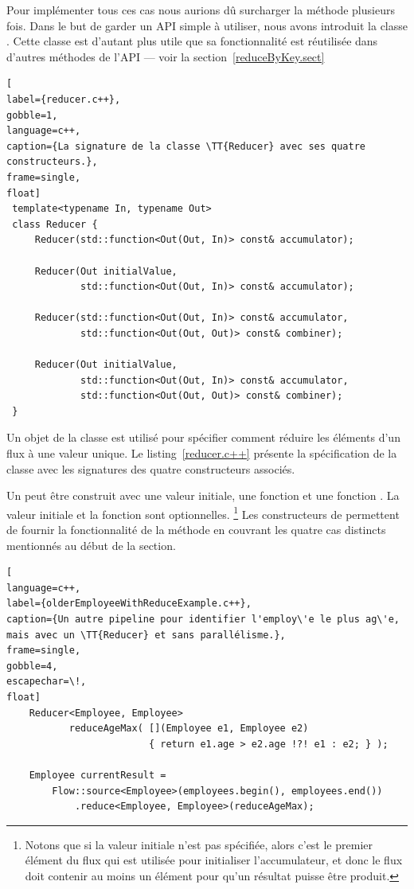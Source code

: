 Pour impl\'ementer tous ces cas nous aurions d\^u surcharger la m\'ethode   plusieurs fois. Dans le but de garder un API simple \`a utiliser, nous avons introduit la classe  . Cette classe est d'autant plus utile que sa fonctionnalit\'e est r\'eutilis\'ee dans d'autres m\'ethodes de l'API --- voir la section~\ref{reduceByKey.sect}


\begin{lstlisting}[
label={reducer.c++},
gobble=1,
language=c++,
caption={La signature de la classe \TT{Reducer} avec ses quatre constructeurs.},
frame=single,
float]
 template<typename In, typename Out>
 class Reducer {
     Reducer(std::function<Out(Out, In)> const& accumulator);

     Reducer(Out initialValue, 
             std::function<Out(Out, In)> const& accumulator);
                	   
     Reducer(std::function<Out(Out, In)> const& accumulator,
             std::function<Out(Out, Out)> const& combiner);
                               	   
     Reducer(Out initialValue, 
             std::function<Out(Out, In)> const& accumulator,
             std::function<Out(Out, Out)> const& combiner);               
 }
\end{lstlisting}


Un objet de la classe  est utilis\'e pour sp\'ecifier comment r\'eduire les \'el\'ements d'un flux \`a une valeur unique. Le listing~\ref{reducer.c++} présente la spécification  de la classe  avec les signatures des quatre constructeurs associ\'es. 

Un  peut être construit avec une valeur initiale, une fonction  et une fonction . La valeur initiale et la fonction  sont optionnelles.%
%
\footnote{Notons que si la valeur initiale n'est pas spécifiée, alors
c'est le premier élément du flux qui est utilisée pour initialiser
l'accumulateur, et donc le flux doit contenir au moins un élément pour
qu'un résultat puisse être produit.}
%
Les constructeurs de  permettent de fournir la fonctionnalit\'e de la m\'ethode  en couvrant les quatre cas distincts mentionn\'es au d\'ebut de la section.
%


\begin{lstlisting}[
language=c++,
label={olderEmployeeWithReduceExample.c++},
caption={Un autre pipeline pour identifier l'employ\'e le plus ag\'e, mais avec un \TT{Reducer} et sans parallélisme.},
frame=single,
gobble=4,
escapechar=\!,
float]
    Reducer<Employee, Employee> 
           reduceAgeMax( [](Employee e1, Employee e2) 
                         { return e1.age > e2.age !?! e1 : e2; } );

    Employee currentResult =
        Flow::source<Employee>(employees.begin(), employees.end())
            .reduce<Employee, Employee>(reduceAgeMax);
\end{lstlisting}


